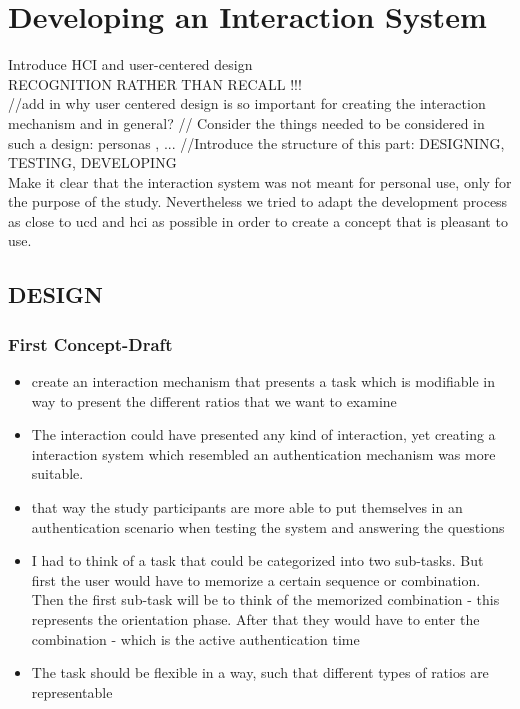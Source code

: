 
\chapter{Developing an Interaction System}\label{ch:forth}

Introduce HCI and user-centered design\\

RECOGNITION RATHER THAN RECALL !!!\\


//add in why user centered design is so important for creating the interaction mechanism and in general?
// Consider the things needed to be considered in such a design: personas , ...
//Introduce the structure of this part: DESIGNING, TESTING, DEVELOPING \\

Make it clear that the interaction system was not meant for personal use, only for the purpose of the study.
Nevertheless we tried to adapt the development process as close to ucd and hci as possible in order to create a concept that is pleasant to use. 

\section {DESIGN}

\subsection{First Concept-Draft}

\begin{itemize}
\item create an interaction mechanism that presents a task which is modifiable in way to present the different ratios that we want to examine
\item The interaction could have presented any kind of interaction, yet creating a interaction system which resembled an authentication mechanism was more suitable.
\item that way the study participants are more able to put themselves in an authentication scenario when testing the system and answering the questions 
\item I had to think of a task that could be categorized into two sub-tasks. But first the user would have to memorize a certain sequence or combination. Then the first sub-task will be to think of the memorized combination - this represents the orientation phase. After that they would have to enter the combination - which is the active authentication time 
\item The task should be flexible in a way, such that different types of ratios are representable
\end{itemize}

